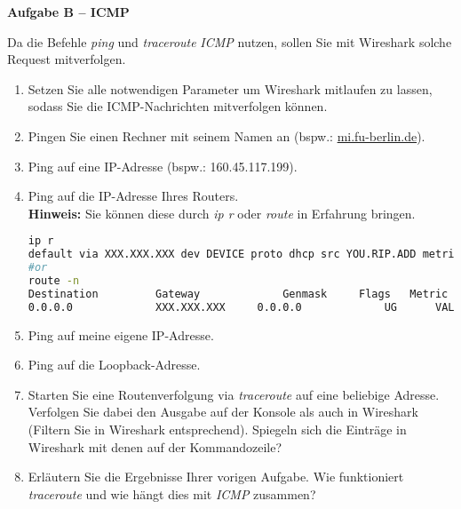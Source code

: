 \documentclass[paper=a4,fontsize=11pt]{scrartcl}%
\begin{document}
\begin{center}\Large{\textbf{Aufgabe B -- ICMP}}\end{center}\vskip0.2in
Da die Befehle \emph{ping} und \emph{traceroute} \emph{ICMP} nutzen, sollen Sie mit Wireshark solche Request mitverfolgen.
\begin{enumerate}
	\item Setzen Sie alle notwendigen Parameter um Wireshark mitlaufen zu lassen, sodass Sie die ICMP-Nachrichten mitverfolgen können.
	\item Pingen Sie einen Rechner mit seinem Namen an (bspw.: \url{mi.fu-berlin.de}).
	\item Ping auf eine IP-Adresse (bspw.: 160.45.117.199).
	\item Ping auf die IP-Adresse Ihres Routers. \\\textbf{Hinweis:} Sie können diese durch \emph{ip r} oder \emph{route} in Erfahrung bringen. 
	\begin{lstlisting}[style=Bash, language=Bash]
ip r
default via XXX.XXX.XXX dev DEVICE proto dhcp src YOU.RIP.ADD metric VALUE
#or
route -n
Destination     	Gateway         	Genmask		Flags 	Metric 		Ref    	Use 	Iface
0.0.0.0          	XXX.XXX.XXX   	0.0.0.0         	UG    	VALUE    	0        	0 		DEVICE
	\end{lstlisting}
	\item Ping auf meine eigene IP-Adresse.
	\item Ping auf die Loopback-Adresse.
	\item Starten Sie eine Routenverfolgung via \emph{traceroute} auf eine beliebige Adresse. Verfolgen Sie dabei den Ausgabe auf der Konsole als auch in Wireshark (Filtern Sie in Wireshark entsprechend). Spiegeln sich die Einträge in Wireshark mit denen auf der Kommandozeile?
	\item Erläutern Sie die Ergebnisse Ihrer vorigen Aufgabe. Wie funktioniert \emph{traceroute} und wie hängt dies mit \emph{ICMP} zusammen?
\end{enumerate}
\end{document}
